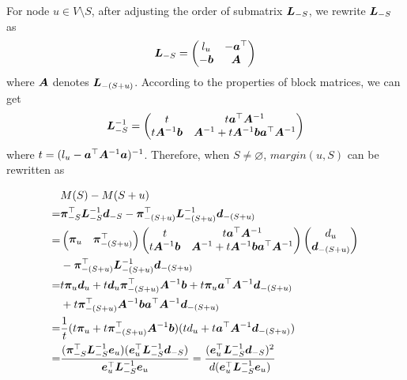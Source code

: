 \documentclass[sigconf]{acmart}
\begin{document}
For node \(u\in V\setminus S\), after adjusting the order of submatrix \(\boldsymbol{L}_{-S}\), we rewrite \(\boldsymbol{L}_{-S}\) as
\[\boldsymbol{L}_{-S}=\begin{pmatrix}l_u & -\boldsymbol{a}^\top \\-\boldsymbol{b}&\boldsymbol{A}\end{pmatrix}\]
where \(\boldsymbol{A}\) denotes \(\boldsymbol{L}_{-(S+u)}\).
According to the properties of block matrices, we can get
\[\boldsymbol{L}_{-S}^{-1}=\begin{pmatrix}
        t & t\boldsymbol{a}^\top\boldsymbol{A}^{-1} \\t\boldsymbol{A}^{-1}\boldsymbol{b}&\boldsymbol{A}^{-1}+t\boldsymbol{A}^{-1}\boldsymbol{b}\boldsymbol{a}^\top\boldsymbol{A}^{-1}
    \end{pmatrix}\]
where \(t=(l_u-\boldsymbol{a}^\top\boldsymbol{A}^{-1}\boldsymbol{a})^{-1}\).
Therefore, when \(S\neq\varnothing\), \(margin(u,S)\) can be rewritten as

\begin{equation}\label{eq:margin-deriv}
    \begin{split}
        &M(S)-M(S+u)\\
        =&\boldsymbol{\pi}_{-S}^\top\boldsymbol{L}_{-S}^{-1}\boldsymbol{d}_{-S}-\boldsymbol{\pi}_{-(S+u)}^\top\boldsymbol{L}_{-(S+u)}^{-1}\boldsymbol{d}_{-(S+u)}\\
        =&\begin{pmatrix}\boldsymbol{\pi}_u&\boldsymbol{\pi}_{-(S+u)}^\top\end{pmatrix}\begin{pmatrix}t & t\boldsymbol{a}^\top\boldsymbol{A}^{-1} \\t\boldsymbol{A}^{-1}\boldsymbol{b}&\boldsymbol{A}^{-1}+t\boldsymbol{A}^{-1}\boldsymbol{b}\boldsymbol{a}^\top\boldsymbol{A}^{-1}\end{pmatrix}\begin{pmatrix}d_u\\\boldsymbol{d}_{-(S+u)}\end{pmatrix}\\
        &-\boldsymbol{\pi}_{-(S+u)}^\top\boldsymbol{L}_{-(S+u)}^{-1}\boldsymbol{d}_{-(S+u)}\\
        =&t\boldsymbol{\pi}_u\boldsymbol{d}_u+t\boldsymbol{d}_u\boldsymbol{\pi}_{-(S+u)}^\top\boldsymbol{A}^{-1}\boldsymbol{b}+t\boldsymbol{\pi}_u\boldsymbol{a}^\top\boldsymbol{A}^{-1}\boldsymbol{d}_{-(S+u)}\\
        &+t\boldsymbol{\pi}_{-(S+u)}^\top\boldsymbol{A}^{-1}\boldsymbol{b}\boldsymbol{a}^\top\boldsymbol{A}^{-1}\boldsymbol{d}_{-(S+u)}\\
        =&\frac1t(t\boldsymbol{\pi}_u+t\boldsymbol{\pi}_{-(S+u)}^\top\boldsymbol{A}^{-1}\boldsymbol{b})(td_u+t\boldsymbol{a}^\top\boldsymbol{A}^{-1}\boldsymbol{d}_{-(S+u)})\\
        =&\frac{(\boldsymbol{\pi}_{-S}^\top\boldsymbol{L}_{-S}^{-1}\boldsymbol{e}_u)(\boldsymbol{e}_u^\top\boldsymbol{L}_{-S}^{-1}\boldsymbol{d}_{-S})}{\boldsymbol{e}_u^\top\boldsymbol{L}_{-S}^{-1}\boldsymbol{e}_u}=\frac{(\boldsymbol{e}_u^\top\boldsymbol{L}_{-S}^{-1}\boldsymbol{d}_{-S})^2}{d(\boldsymbol{e}_u^\top\boldsymbol{L}_{-S}^{-1}\boldsymbol{e}_u)}
    \end{split}
\end{equation}
\end{document}
